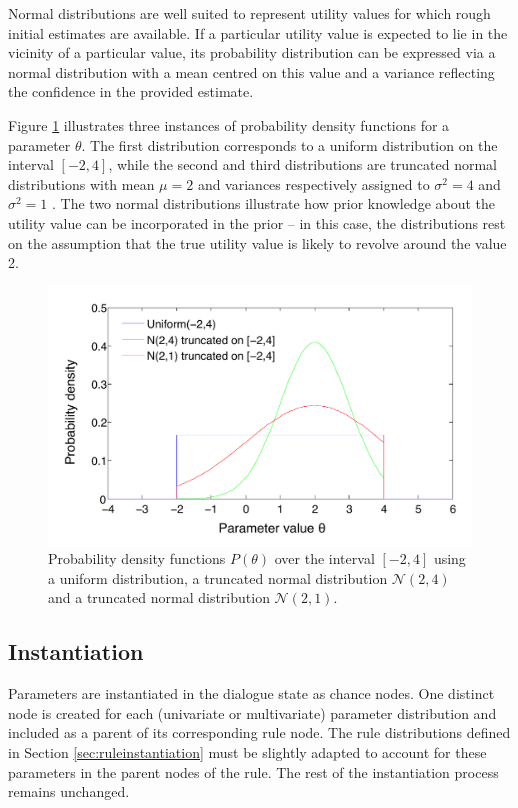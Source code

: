 Normal distributions are well suited to represent utility values for which rough initial estimates are available. If a particular utility value is expected to lie in the vicinity of a particular value, its probability distribution can be expressed via a normal distribution with a mean centred on this value and a variance reflecting the confidence in the provided estimate. 

Figure \ref{fig:uniformn} illustrates three instances of probability density functions for a parameter $\theta$.  The first distribution corresponds to a uniform distribution on the interval $[-2,4]$, while the second and third distributions are truncated normal distributions with mean $\mu=2$ and variances respectively assigned to $\sigma^2=4$ and $\sigma^2=1$ . The two normal distributions illustrate how prior knowledge about the utility value can be incorporated in the prior -- in this case, the distributions rest on the assumption that the true utility value is likely to revolve around the value 2. 

\begin{figure}[ht]
\centering
\includegraphics[scale=0.45]{imgs/uniformn.pdf}
\caption{Probability density functions $P(\theta)$ over the interval $[-2,4]$ using a uniform distribution, a truncated normal distribution $\mathcal{N}(2,4)$ and a truncated normal distribution $\mathcal{N}(2,1)$.} 
\label{fig:uniformn}
\end{figure}

\subsection{Instantiation}
\label{sec:rule-params-instantiation}

Parameters are instantiated in the dialogue state as chance nodes.  One distinct node is created for each (univariate or multivariate) parameter distribution and included as a parent of its corresponding rule node. The rule distributions defined in Section \ref{sec:ruleinstantiation} must be slightly adapted to account for these parameters in the parent nodes of the rule.  The rest of the instantiation process remains unchanged. 

